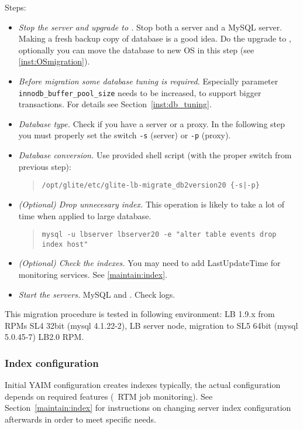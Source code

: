 Steps:
\begin{itemize}
 \item \emph{Stop the server and upgrade to .} Stop both a \LB
 server and a MySQL server. Making a fresh backup copy of database is
 a good idea. Do the upgrade to , optionally you can move the
 database to new OS in this step (see \ref{inst:OSmigration}).
 \item \emph{Before migration some database tuning is
 required.} Especially parameter \texttt{innodb\_buffer\_pool\_size}
 needs to be increased, to support bigger transactions. For details
 see Section~\ref{inst:db_tuning}.
 \item \emph{Database type.} Check if you have a \LB server or a \LB
 proxy. In the following step you must properly set the switch
 \verb'-s' (server) or \verb'-p' (proxy).
 \item \emph{Database conversion.} Use provided shell script (with the proper
  switch from previous step):
  \begin{quote}
  \verb'/opt/glite/etc/glite-lb-migrate_db2version20 {-s|-p}'
  \end{quote}
 \item \emph{(Optional) Drop unnecesary index.} This operation is
  likely to take a lot of time when applied to large database.
  \begin{quote}
  \verb'mysql -u lbserver lbserver20 -e "alter table events drop index host"'
  \end{quote}
 \item \emph{(Optional) Check the \LB indexes.} You may need to add
 LastUpdateTime for monitoring services. See \ref{maintain:index}.
 \item \emph{Start the servers.} MySQL and \LB. Check logs.
\end{itemize}

This migration procedure is tested in following environment: LB 1.9.x
from RPMs SL4 32bit (mysql 4.1.22-2), LB server node, migration to SL5
64bit (mysql 5.0.45-7) LB2.0 RPM. 


\subsubsection{Index configuration}

Initial YAIM configuration creates \LB indexes typically,
the actual configuration depends on required features (\eg\ RTM job monitoring).
See Section~\ref{maintain:index} for instructions
on changing \LB server index configuration afterwards in order
to meet specific needs.


